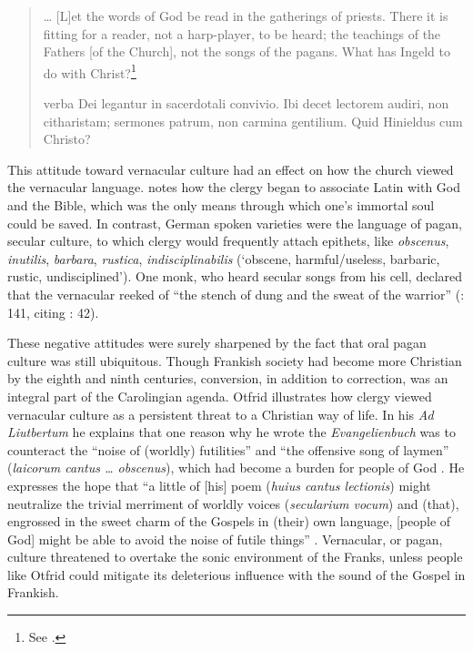 \begin{quote}
{\dots} [L]et the words of God be read in the gatherings of priests. There it is fitting for a reader, not a harp-player, to be heard; the teachings of the Fathers [of the Church], not the songs of the pagans. What has Ingeld to do with Christ?\footnote{See \citet[181--183]{Dümmler1895}.}

verba Dei legantur in sacerdotali convivio. Ibi decet lectorem audiri, non citharistam; sermones patrum, non carmina gentilium. Quid Hinieldus cum Christo?
\end{quote}

\noindent This attitude toward vernacular culture had an effect on how the church viewed the vernacular language. \citet[141--142]{Edwards1994} notes how the clergy began to associate Latin with God and the Bible, which was the only means through which one’s immortal soul could be saved. In contrast, German spoken varieties were the language of pagan, secular culture, to which clergy would frequently attach epithets, like \textit{obscenus}, \textit{inutilis}, \textit{barbara}, \textit{rustica}, \textit{indisciplinabilis} (‘obscene, harmful/useless, barbaric, rustic, undisciplined’). One monk, who heard secular songs from his cell, declared that the vernacular reeked of “the stench of dung and the sweat of the warrior” (\citealt{Edwards1994}: 141, citing \citealt{Haubrichs1988}: 42).

These negative attitudes were surely sharpened by the fact that oral pagan culture was still ubiquitous. Though Frankish society had become more Christian by the eighth and ninth centuries, conversion, in addition to correction, was an integral part of the Carolingian agenda. Otfrid illustrates how clergy viewed vernacular culture as a persistent threat to a Christian way of life. In his \textit{Ad Liutbertum} he explains that one reason why he wrote the \textit{Evangelienbuch} was to counteract the “noise of (worldly) futilities” and “the offensive song of laymen” (\textit{laicorum cantus … obscenus}), which had become a burden for people of God \citep[873]{Magoun1943}. He expresses the hope that “a little of [his] poem (\textit{huius cantus lectionis}) might neutralize the trivial merriment of worldly voices (\textit{secularium vocum}) and (that), engrossed in the sweet charm of the Gospels in (their) own language, [people of God] might be able to avoid the noise of futile things” \citep[873--874]{Magoun1943}. Vernacular, or pagan, culture threatened to overtake the sonic environment of the Franks, unless people like Otfrid could mitigate its deleterious influence with the sound of the Gospel in Frankish.

